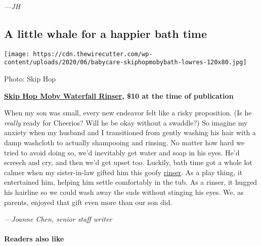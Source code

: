 \emph{---JH}

\hypertarget{a-little-whale-for-a-happier-bath-time}{%
\subsection{A little whale for a happier bath
time}\label{a-little-whale-for-a-happier-bath-time}}

\texttt{[image: https://cdn.thewirecutter.com/wp-content/uploads/2020/06/babycare-skiphopmobybath-lowres-120x80.jpg]}

Photo: Skip Hop

\textbf{\href{https://www.nytimes3xbfgragh.onion/wirecutter/out/link/39073/162828/4/115962/?merchant=Amazon}{Skip
Hop Moby Waterfall Rinser}, \$10 at the time of publication}

When my son was small, every new endeavor felt like a risky proposition.
(Is he \emph{really} ready for Cheerios? Will he be okay without a
swaddle?) So imagine my anxiety when my husband and I transitioned from
gently washing his hair with a damp washcloth to actually shampooing and
rinsing. No matter how hard we tried to avoid doing so, we'd inevitably
get water and soap in his eyes. He'd screech and cry, and then we'd get
upset too. Luckily, bath time got a whole lot calmer when my
sister-in-law gifted him this goofy
\href{https://www.nytimes3xbfgragh.onion/wirecutter/out/link/39073/162828/4/115962/?merchant=Amazon}{rinser}.
As a play thing, it entertained him, helping him settle comfortably in
the tub. As a rinser, it hugged his hairline so we could wash away the
suds without stinging his eyes. We, as parents, enjoyed that gift even
more than our son did.

\emph{---Joanne Chen, senior staff writer}

\hypertarget{readers-also-like}{%
\paragraph{Readers also like}\label{readers-also-like}}

